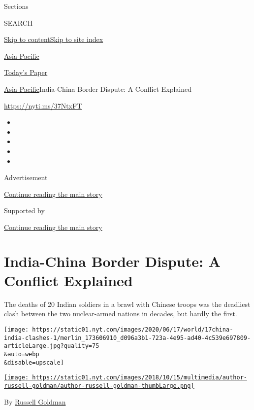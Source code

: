 Sections

SEARCH

\protect\hyperlink{site-content}{Skip to
content}\protect\hyperlink{site-index}{Skip to site index}

\href{https://www.nytimes.com/section/world/asia}{Asia Pacific}

\href{https://myaccount.nytimes.com/auth/login?response_type=cookie\&client_id=vi}{}

\href{https://www.nytimes.com/section/todayspaper}{Today's Paper}

\href{/section/world/asia}{Asia Pacific}\textbar{}India-China Border
Dispute: A Conflict Explained

\url{https://nyti.ms/37NtxFT}

\begin{itemize}
\item
\item
\item
\item
\item
\end{itemize}

Advertisement

\protect\hyperlink{after-top}{Continue reading the main story}

Supported by

\protect\hyperlink{after-sponsor}{Continue reading the main story}

\hypertarget{india-china-border-dispute-a-conflict-explained}{%
\section{India-China Border Dispute: A Conflict
Explained}\label{india-china-border-dispute-a-conflict-explained}}

The deaths of 20 Indian soldiers in a brawl with Chinese troops was the
deadliest clash between the two nuclear-armed nations in decades, but
hardly the first.

\texttt{[image: https://static01.nyt.com/images/2020/06/17/world/17china-india-clashes-1/merlin\_173606910\_d096a3b1-723a-4e95-ad40-4c539e697809-articleLarge.jpg?quality=75\\\&auto=webp\\\&disable=upscale]}

\href{https://www.nytimes.com/by/russell-goldman}{\texttt{[image: https://static01.nyt.com/images/2018/10/15/multimedia/author-russell-goldman/author-russell-goldman-thumbLarge.png]}}

By \href{https://www.nytimes.com/by/russell-goldman}{Russell Goldman}

